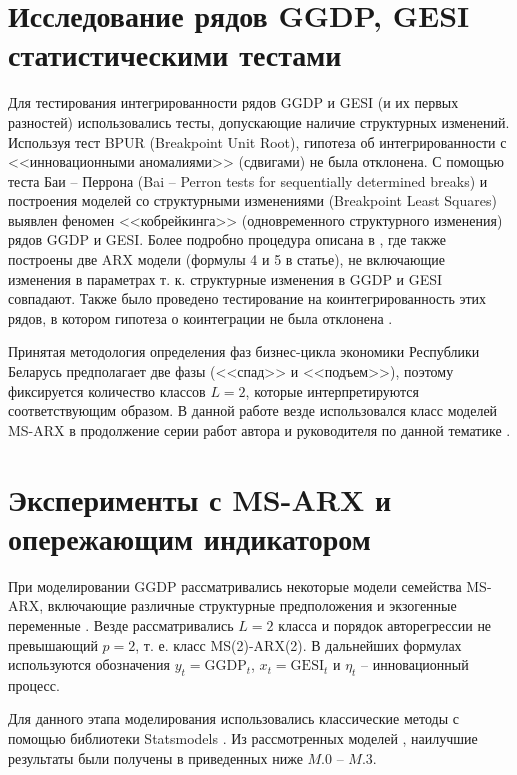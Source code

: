 \documentclass[a4paper,14pt]{extreport}
\begin{document}
\section{Исследование рядов GGDP, GESI статистическими тестами}

\label{section:gdp_stattests}

Для тестирования интегрированности рядов GGDP и GESI (и их первых разностей) использовались тесты, допускающие наличие структурных изменений. Используя тест BPUR (Breakpoint Unit Root), гипотеза об интегрированности с <<инновационными аномалиями>> (сдвигами) не была отклонена. 
С помощью теста Баи – Перрона (Bai – Perron tests for sequentially determined breaks) и построения моделей со структурными изменениями (Breakpoint Least Squares) выявлен феномен <<кобрейкинга>> (одновременного структурного изменения) рядов GGDP и GESI. 
Более подробно процедура описана в \cite{mak_mal_bv_2020}, где также построены две ARX модели (формулы 4 и 5 в статье), не включающие изменения в параметрах т. к.  структурные изменения в GGDP и GESI совпадают. Также было проведено тестирование на коинтегрированность этих рядов, в котором гипотеза о коинтеграции не была отклонена \cite{mak_mal_bv_2020}. 

Принятая методология определения фаз бизнес-цикла экономики Республики Беларусь предполагает две фазы (<<спад>> и <<подъем>>), поэтому фиксируется количество классов $L=2$, которые интерпретируются соответствующим образом. В данной работе везде использовался класс моделей MS-ARX в продолжение серии работ автора и руководителя по данной тематике \cite{mak_mal_bv_2018,malVARforCycles,mak_hse_paper,mak_bsu_conf_2017}.


\section{Эксперименты с MS-ARX и опережающим индикатором}

При моделировании GGDP рассматривались некоторые модели семейства MS-ARX, включающие различные структурные предположения и экзогенные переменные \cite{mak_mal_bv_2020}. Везде рассматривались $L=2$ класса и порядок авторегрессии не превышающий $p=2$, т. е. класс MS(2)-ARX(2). В дальнейших формулах используются обозначения $y_t = \text{GGDP}_t$, \: $x_t = \text{GESI}_t$ и $\eta_t$ -- инновационный процесс.

Для данного этапа моделирования использовались классические методы с помощью библиотеки Statsmodels \cite{statsmodels}. Из рассмотренных моделей \cite{mak_mal_bv_2020}, наилучшие результаты были получены в приведенных ниже $M.0$ -- $M.3$.
\end{document}
